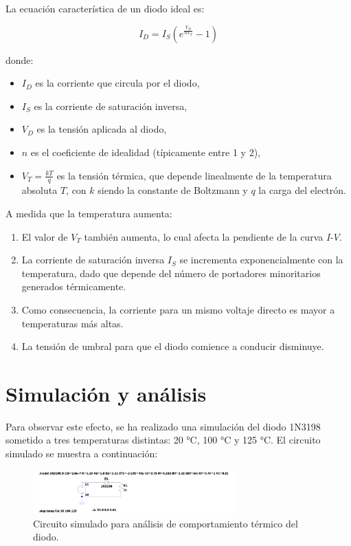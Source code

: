 \documentclass[chaptersright]{informeutn}
\begin{document}
    La ecuación característica de un diodo ideal es:
    
    \[
    I_D = I_S \left( e^{\frac{V_D}{n V_T}} - 1 \right)
    \]
    
    donde:
    \begin{itemize}
        \item \(I_D\) es la corriente que circula por el diodo,
        \item \(I_S\) es la corriente de saturación inversa,
        \item \(V_D\) es la tensión aplicada al diodo,
        \item \(n\) es el coeficiente de idealidad (típicamente entre 1 y 2),
        \item \(V_T = \frac{kT}{q}\) es la tensión térmica, que depende linealmente de la temperatura absoluta \(T\), con
            \(k\) siendo la constante de Boltzmann y \(q\) la carga del electrón.
    \end{itemize}
    
    A medida que la temperatura aumenta:
    \begin{enumerate}
        \item El valor de \(V_T\) también aumenta, lo cual afecta la pendiente de la curva \(I\)-\(V\).
        \item La corriente de saturación inversa \(I_S\) se incrementa exponencialmente con la temperatura, dado que 
            depende del número de portadores minoritarios generados térmicamente.
        \item Como consecuencia, la corriente para un mismo voltaje directo es mayor a temperaturas más altas.
        \item La tensión de umbral para que el diodo comience a conducir disminuye.
    \end{enumerate}
  
  \section{Simulación y análisis}
  
    Para observar este efecto, se ha realizado una simulación del diodo 1N3198 sometido a tres temperaturas distintas: 
    20 °C, 100 °C y 125 °C. El circuito simulado se muestra a continuación:
    
    \begin{figure}[H]
        \centering
        \includegraphics[width=0.7\textwidth]{pictures/comparacion_temperatura_circuito.jpeg}
        \caption{Circuito simulado para análisis de comportamiento térmico del diodo.}
    \end{figure}
    
\end{document}
